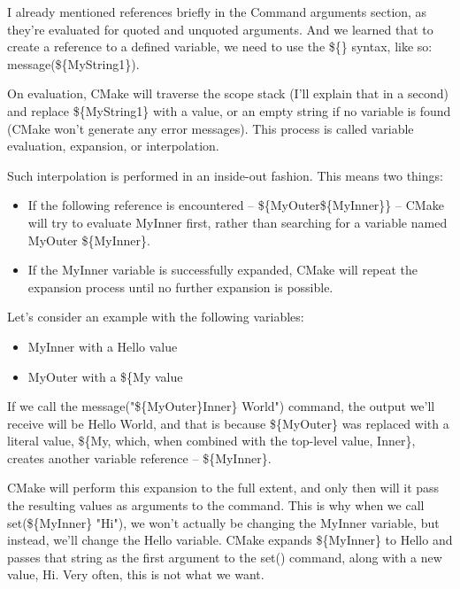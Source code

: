 
I already mentioned references briefly in the Command arguments section, as they're evaluated for quoted and unquoted arguments. And we learned that to create a reference to a defined variable, we need to use the \$\{\} syntax, like so: message(\$\{MyString1\}).

On evaluation, CMake will traverse the scope stack (I'll explain that in a second) and replace \$\{MyString1\} with a value, or an empty string if no variable is found (CMake won't generate any error messages). This process is called variable evaluation, expansion, or interpolation.

Such interpolation is performed in an inside-out fashion. This means two things:

\begin{itemize}
\item 
If the following reference is encountered – \$\{MyOuter\$\{MyInner\}\} – CMake will try to evaluate MyInner first, rather than searching for a variable named MyOuter \$\{MyInner\}.

\item 
If the MyInner variable is successfully expanded, CMake will repeat the expansion process until no further expansion is possible.
\end{itemize}

Let's consider an example with the following variables:

\begin{itemize}
\item 
MyInner with a Hello value

\item 
MyOuter with a \$\{My value
\end{itemize}

If we call the message("\$\{MyOuter\}Inner\} World") command, the output we'll receive will be Hello World, and that is because \$\{MyOuter\} was replaced with a literal value, \$\{My, which, when combined with the top-level value, Inner\}, creates another variable reference – \$\{MyInner\}.

CMake will perform this expansion to the full extent, and only then will it pass the resulting values as arguments to the command. This is why when we call set(\$\{MyInner\} "Hi"), we won't actually be changing the MyInner variable, but instead, we'll change the Hello variable. CMake expands \$\{MyInner\} to Hello and passes that string as the first argument to the set() command, along with a new value, Hi. Very often, this is not what we want.

